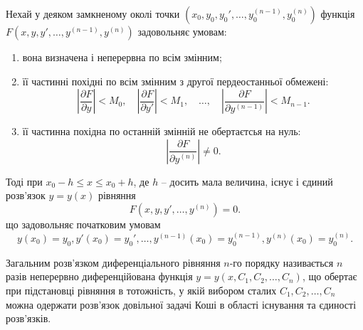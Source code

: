 \begin{theorem}
	Нехай у деяком замкненому околі точки $\left(x_0, y_0, y_0', \ldots, y_0^{(n-1)}, y_0^{(n)}\right)$ функція $F\left(x,y,y',\ldots,y^{(n-1)},y^{(n)}\right)$ задовольняє умовам:
	\begin{enumerate}
		\item вона визначена і неперервна по всім змінним;
		\item її частинні похідні по всім змінним з другої пердеостанньої обмежені:
		\begin{equation*}
			\left|\frac{\partial F}{\partial y}\right| < M_0, \quad \left|\frac{\partial F}{\partial y'}\right| < M_1, \quad \ldots, \quad \left|\frac{\partial F}{\partial y^{(n-1)}}\right| < M_{n-1}.
		\end{equation*}
		\item її частинна похідна по останній змінній не обертаєтсья на нуль: \[\left|\frac{\partial F}{\partial y^{(n)}}\right|\ne0.\]
	\end{enumerate}
	Тоді при $x_0 - h \le x \le x_0 + h$, де $h$ -- досить мала величина, існує і єдиний розв’язок $y=y(x)$ рівняння
	\begin{equation*}
		F \left( x, y, y', \ldots, y^{(n)} \right) = 0.
	\end{equation*}
	що задовольняє початковим умовам
	\begin{equation*}
		y(x_0) = y_0, y'(x_0) = y_0', \ldots, y^{(n - 1)} (x_0) = y_0^{(n-1)}, y^{(n)} (x_0) = y_0^{(n)}.
	\end{equation*}
\end{theorem}
\begin{definition}
	Загальним розв’язком диференціального рівняння $n$-го порядку називається $n$ разів неперервно диференційована функція $y=y(x,C_1,C_2,\ldots,C_n)$, що обертає при підстановці рівняння в тотожність, у якій вибором сталих $C_1, C_2, \ldots, C_n$ можна одержати розв’язок довільної задачі Коші в області існування та єдиності розв’язків.
\end{definition}

